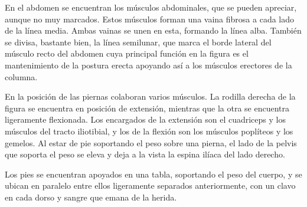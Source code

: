 En el abdomen se encuentran los músculos abdominales, que se pueden apreciar, aunque no muy marcados. Estos músculos forman una vaina fibrosa a cada lado de la línea media. Ambas vainas se unen en esta, formando la línea alba. También se divisa, bastante bien, la línea semilunar, que marca el borde lateral del músculo recto del abdomen cuya principal función en la figura es el mantenimiento de la postura erecta apoyando así a los músculos erectores de la columna.


En la posición de las piernas colaboran varios músculos. La rodilla derecha de la figura se encuentra en posición de extensión, mientras que la otra se encuentra ligeramente flexionada. Los encargados de la extensión son el cuadriceps y los músculos del tracto iliotibial, y los de la flexión son los músculos poplíteos y los gemelos. Al estar de pie soportando el peso sobre una pierna, el lado de la pelvis que soporta el peso se eleva %
y deja a la vista la espina ilíaca del lado derecho.

Los pies se encuentran apoyados en una tabla, soportando el peso del cuerpo, y se ubican en paralelo entre ellos ligeramente separados anteriormente, con un clavo en cada dorso y sangre que emana de la herida. %



